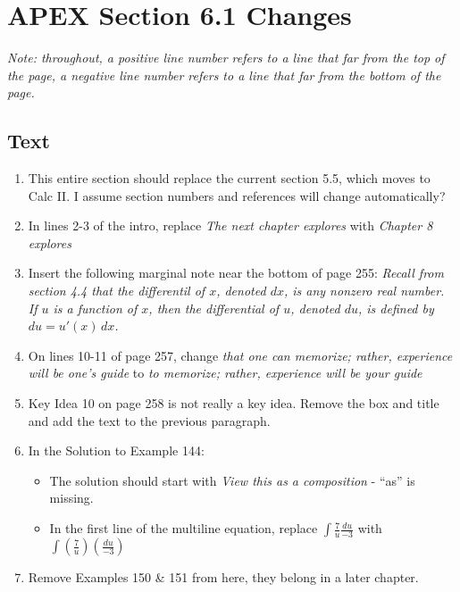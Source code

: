 \documentclass[11pt]{report}
\begin{document}
\chapter*{APEX Section 6.1 Changes}

{\slshape Note: throughout, a positive line number refers to a line that far from the top of the page, a negative line number refers to a line that far from the bottom of the page.}

\section*{Text}

\begin{enumerate}

\item This entire section should replace the current section 5.5, which moves to Calc II. I assume section numbers and references will change automatically?

\item In lines 2-3 of the intro, replace \emph{The next chapter explores} with \emph{Chapter 8 explores}

\item Insert the following marginal note near the bottom of page 255: {\slshape Recall from section 4.4 that the differentil of $x$, denoted $dx$, is any nonzero real number.  If $u$ is a function of $x$, then the differential of $u$, denoted $du$, is defined by $du=u'(x)\,dx$.}

\item On lines 10-11 of page 257, change \emph{that one can memorize; rather, experience will be one's guide} to \emph{to memorize; rather, experience will be your guide}

\item Key Idea 10 on page 258 is not really a key idea. Remove the box and title and add the text to the previous paragraph.

\item In the Solution to Example 144:
\begin{itemize}
\item The solution should start with \emph{View this as a composition} - ``as'' is missing.
\item In the first line of the multiline equation, replace $\displaystyle\int \frac 7u\frac {du}{-3}$ with $\displaystyle \int\left(\frac 7u\right)\left(\frac{du}{-3}\right)$
\end{itemize}

\item Remove Examples 150 \& 151 from here, they belong in a later chapter.


\end{enumerate}
\end{document}
